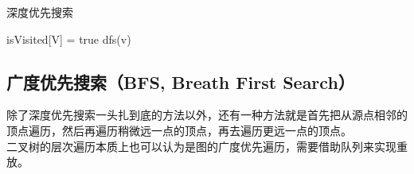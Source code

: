 \begin{algorithm}[H]
    \caption{深度优先搜索}
    \begin{algorithmic}[1]
        \State isVisited[V] = true
        dfs(v)
        \EndIf
        \EndFor
        \EndProcedure
    \end{algorithmic}
\end{algorithm}

\subsection{广度优先搜索（BFS, Breath First Search）}

除了深度优先搜索一头扎到底的方法以外，还有一种方法就是首先把从源点相邻的顶点遍历，然后再遍历稍微远一点的顶点，再去遍历更远一点的顶点。 \\

二叉树的层次遍历本质上也可以认为是图的广度优先遍历，需要借助队列来实现重放。 \\


